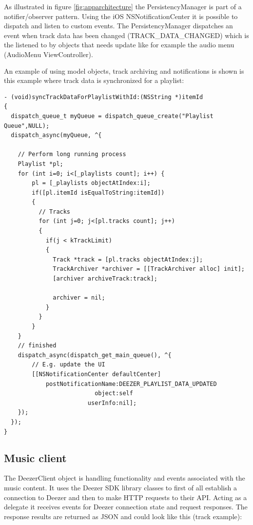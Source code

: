 As illustrated in figure \ref{fig:apparchitecture} the PersistencyManager is part of a notifier/observer pattern. Using the iOS NSNotificationCenter it is possible to dispatch and listen to custom events. The PersistencyManager dispatches an event when track data has been changed (TRACK\_DATA\_CHANGED) which is the listened to by objects that needs update like for example the audio menu (AudioMenu ViewController).

An example of using model objects, track archiving and notifications is shown is this example where track data is synchronized for a playlist:

\begin{lstlisting}
- (void)syncTrackDataForPlaylistWithId:(NSString *)itemId
{
  dispatch_queue_t myQueue = dispatch_queue_create("Playlist Queue",NULL);
  dispatch_async(myQueue, ^{
        
    // Perform long running process
    Playlist *pl;
    for (int i=0; i<[_playlists count]; i++) {
        pl = [_playlists objectAtIndex:i];
        if([pl.itemId isEqualToString:itemId])
        {
          // Tracks
          for (int j=0; j<[pl.tracks count]; j++)
          {
            if(j < kTrackLimit)
            {
              Track *track = [pl.tracks objectAtIndex:j];
              TrackArchiver *archiver = [[TrackArchiver alloc] init];
              [archiver archiveTrack:track];
              
              archiver = nil;
            }
          }
        }
    }
    // finished
    dispatch_async(dispatch_get_main_queue(), ^{
        // E.g. update the UI
        [[NSNotificationCenter defaultCenter] 
            postNotificationName:DEEZER_PLAYLIST_DATA_UPDATED 
                          object:self 
                        userInfo:nil];
    });
  });
}
\end{lstlisting}

\subsection{Music client}
The DeezerClient object is handling functionality and events associated with the music content. It uses the Deezer SDK library classes to first of all establish a connection to Deezer and then to make HTTP requests to their API. Acting as a delegate it receives events for Deezer connection state and request responses. The response results are returned as JSON and could look like this (track example):


